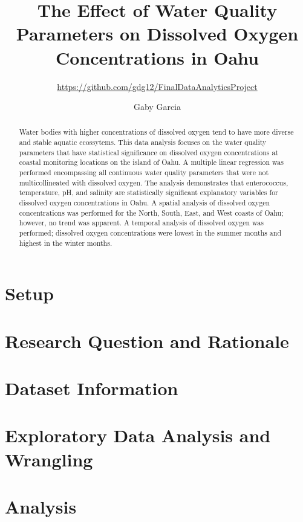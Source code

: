 \documentclass[12pt,]{article}
\title{The Effect of Water Quality Parameters on Dissolved Oxygen
Concentrations in Oahu}
\subtitle{\url{https://github.com/gdg12/FinalDataAnalyticsProject}}
\author{Gaby Garcia}
\date{}
\begin{document}
\maketitle
\begin{abstract}
Water bodies with higher concentrations of dissolved oxygen tend to have
more diverse and stable aquatic ecossytems. This data analysis focuses
on the water quality parameters that have statistical significance on
dissolved oxygen concentrations at coastal monitoring locations on the
island of Oahu. A multiple linear regression was performed encompassing
all continuous water quality parameters that were not multicollineated
with dissolved oxygen. The analysis demonstrates that enterococcus,
temperature, pH, and salinity are statistically significant explanatory
variables for dissolved oxygen concentrations in Oahu. A spatial
analysis of dissolved oxygen concentrations was performed for the North,
South, East, and West coasts of Oahu; however, no trend was apparent. A
temporal analysis of dissolved oxygen was performed; dissolved oxygen
concentrations were lowest in the summer months and highest in the
winter months.
\end{abstract}

\newpage

\tableofcontents 

\section{Setup}\label{setup}

\section{Research Question and
Rationale}\label{research-question-and-rationale}

\section{Dataset Information}\label{dataset-information}

\section{Exploratory Data Analysis and
Wrangling}\label{exploratory-data-analysis-and-wrangling}

\section{Analysis}\label{analysis}
\end{document}
